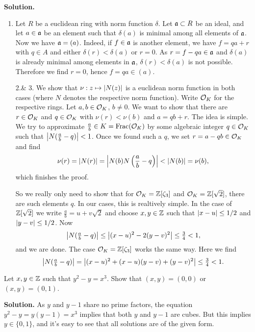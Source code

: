 \documentclass[a4paper,11pt]{article}
\begin{document}
\textbf{Solution.}
\begin{enumerate}
    \item Let $R$ be a euclidean ring with norm function $\delta$. Let $\mathfrak{a}
        \subset R$ be an ideal, and let $a \in \mathfrak{a}$ be an element such that 
        $\delta(a)$ is minimal among all elements of $\mathfrak{a}$. Now we have 
        $\mathfrak{a} = (a)$. Indeed, if $f \in \mathfrak{a}$ is another element, we have 
        $f = qa + r$ with $q \in A$ and either $\delta(r) < \delta(a)$ or 
        $r = 0$. As $r = f - qa \in \mathfrak{a}$ and $\delta(a)$ is already minimal
        among elements in $\mathfrak{a}$, $\delta(r) < \delta(a)$ is not possible.
        Therefore we find $r = 0$, hence $f = qa \in (a)$. 

    \item[2.\& 3.] We show that $\nu: z \mapsto \left\lvert N(z) \right\rvert$ is a euclidean norm
        function in both cases (where $N$ denotes the respective norm function).
        Write $\mathcal{O}_K$ for the respective rings. Let $a,
        b \in \mathcal{O}_K$, $b \neq 0$. We want to show that there 
        are $r \in \mathcal{O}_K$ and $q \in \mathcal{O}_K$ with $\nu(r) < \nu(b)$
        and $a = qb + r$.
        The idea is simple. We try to approximate $\frac ab \in K = \mathrm{Frac}(\mathcal{O}_K)$ by
        some algebraic integer
        $q \in \mathcal{O}_K$ such that $\left\lvert N(\frac ab - q) \right\rvert < 1$. Once we
        found such a $q$, we set $r = a - qb \in \mathcal{O}_K$ and find
        \begin{equation*}
            \nu(r) = \left\lvert N(r) \right\rvert = \left\lvert N(b)N\left(\frac ab -q \right) \right\rvert
            < \left\lvert N(b) \right\rvert = \nu(b),
        \end{equation*}
        which finishes the proof. 

        So we really only need to show that for $\mathcal{O}_K = \mathbb{Z}[\zeta_3]$ and 
        $\mathcal{O}_K = \mathbb{Z}[\sqrt{2}]$, there are such elements $q$. In our cases,
        this is realtively simple. In the case of $\mathbb{Z}[\sqrt 2]$ we write
        $\frac ab = u + v \sqrt 2 $ and choose $x, y \in
        \mathbb{Z}$ such that 
        $\left\lvert x-u \right\rvert \leq 1/2$ and $\left\lvert y-v \right\rvert \leq 1/2$. Now 
        $$\left\lvert N(\tfrac ab - q) \right\rvert \leq \left\lvert (x-u)^2 - 2(y-v)^2 \right\rvert \leq \tfrac 34 < 1,$$ 
        and we are done. The case $\mathcal{O}_K = \mathbb{Z}[\zeta_3]$ works the same way.
        Here we find 
        $$\left\lvert N(\tfrac ab - q) \right\rvert = \left\lvert (x-u)^2 + (x-u)(y-v) + (y-v)^2 \right\rvert \leq \tfrac
        34 < 1.$$


        
\end{enumerate}


Let $x,y \in \mathbb{Z}$ such that $y^2 -y  = x^3$. Show that $(x,y) = (0,0)$ or 
$(x,y) = (0,1)$. 

\textbf{Solution.} 
As $y$ and $y-1$ share no prime factors, the equation $y^2 - y = y(y-1) = x^3$
implies that both $y$ and $y-1$ are cubes. But this implies $y \in \{0, 1\}$,
and it's easy to see that all solutions are of the given form.

\contactend
\end{document}
